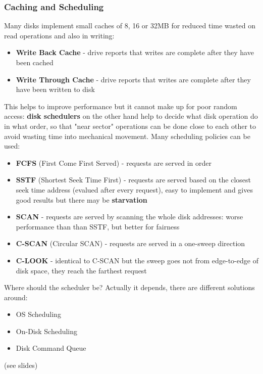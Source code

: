 \subsubsection{Caching and Scheduling}
Many disks implement small caches of 8, 16 or 32MB for reduced time wasted on 
read operations and also in writing:
\begin{itemize}
    \item \textbf{Write Back Cache} - drive reports that writes are complete
    after they have been cached
    \item \textbf{Write Through Cache} - drive reports that writes are complete
    after they have been written to disk
\end{itemize}
This helps to improve performance but it cannot make up for poor random
access: \textbf{disk schedulers} on the other hand help to decide what
disk operation do in what order, so that "near sector" operations can be 
done close to each other to avoid wasting time into mechanical movement.
Many scheduling policies can be used:
\begin{itemize}
    \item \textbf{FCFS} (First Come First Served) - requests are served in order
    \item \textbf{SSTF} (Shortest Seek Time First) - requests are served based
    on the closest seek time address (evalued after every request), easy to 
    implement and gives good results but there may be \textbf{starvation}
    \item \textbf{SCAN} - requests are served by scanning the whole disk
    addresses: worse performance than than SSTF, but better for fairness
    \item \textbf{C-SCAN} (Circular SCAN) - requests are served in a one-sweep
    direction
    \item \textbf{C-LOOK} - identical to C-SCAN but the sweep goes not from 
    edge-to-edge of disk space, they reach the farthest request
\end{itemize}

\begin{notice}{Where should the scheduler be?}
    Actually it depends, there are different solutions around:
    \begin{itemize}
        \item OS Scheduling
        \item On-Disk Scheduling
        \item Disk Command Queue
    \end{itemize}
    (see slides)
\end{notice}

